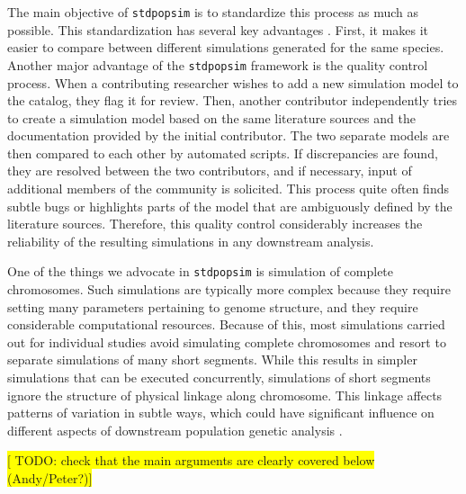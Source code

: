 \documentclass[hidelinks]{article}
\newcommand{\stdpopsim}{\texttt{stdpopsim}\xspace}
\begin{document}
The main objective of \texttt{\stdpopsim} is to standardize this process as much as possible.
This standardization has several key advantages \citep{Adrion2020}. First, it makes it easier to compare between different
simulations generated for the same species. Another major advantage of the
\texttt{\stdpopsim} framework is the quality control process.
When a contributing researcher wishes to add a new simulation model to the catalog,
they flag it for review. Then, another contributor independently tries to create a simulation model based on the same literature sources and the documentation provided by the initial contributor. The two separate models are then
compared to each other by automated scripts. If discrepancies are found, they
are resolved between the two contributors, and if necessary, input of additional members of the community is solicited. This process quite often
finds subtle bugs  \citep{Ragsdale2020} or highlights parts of the model that are
ambiguously defined by the literature sources. 
Therefore, this quality control considerably increases the reliability of the
resulting simulations in any downstream analysis.



One of the things we advocate in \texttt{\stdpopsim} is simulation of complete
chromosomes. Such simulations are typically more complex because they require
setting many parameters pertaining to genome structure, and they require
considerable computational resources. Because of this, most simulations carried
out for individual studies avoid simulating complete chromosomes and resort to
separate simulations of many short segments. While this results in simpler
simulations that can be executed concurrently, %
simulations of short segments ignore the structure of physical linkage along
chromosome. This linkage affects patterns of variation in subtle ways, which could
have significant influence on different aspects of downstream population genetic
analysis \citep{Nelson2020}. 


\noindent\colorbox{yellow}{[ TODO: check that the main arguments are clearly covered below (Andy/Peter?)]}
\end{document}
